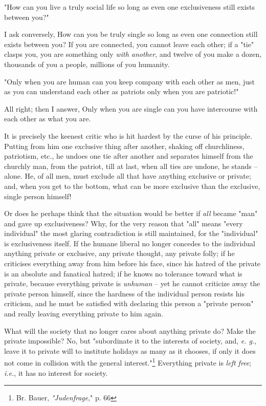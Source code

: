 \documentclass[a4paper]{book}
\begin{document}
"{}How can you live a truly social life so long as even one exclusiveness 
still exists between you?"{}

I ask conversely, How can you be truly single so long as even one connection 
still exists between you? If you are connected, you cannot leave each other; 
if a "{}tie"{} clasps you, you are something only \textit{with another}, and 
twelve of you make a dozen, thousands of you a people, millions of you 
humanity.

"{}Only when you are human can you keep company with each other as men, just 
as you can understand each other as patriots only when you are patriotic!"{}

All right; then I answer, Only when you are single can you have intercourse 
with each other as what you are.

It is precisely the keenest critic who is hit hardest by the curse of his 
principle. Putting from him one exclusive thing after another, shaking off 
churchliness, patriotism, etc., he undoes one tie after another and separates 
himself from the churchly man, from the patriot, till at last, when all ties 
are undone, he stands -- alone. He, of all men, must exclude all that have 
anything exclusive or private; and, when you get to the bottom, what can be 
more exclusive than the exclusive, single person himself!

Or does he perhaps think that the situation would be better if \textit{all} 
became "{}man"{} and gave up exclusiveness? Why, for the very reason that 
"{}all"{} means "{}every individual"{} the most glaring contradiction is still 
maintained, for the "{}individual"{} is exclusiveness itself. If the humane 
liberal no longer concedes to the individual anything private or exclusive, 
any private thought, any private folly; if he criticises everything away from 
him before his face, since his hatred of the private is an absolute and 
fanatical hatred; if he knows no tolerance toward what is private, because 
everything private is \textit{unhuman} -- yet he cannot criticize away the 
private person himself, since the hardness of the individual person resists 
his criticism, and he must be satisfied with declaring this person a 
"{}private person"{} and really leaving everything private to him again.

What will the society that no longer cares about anything private do? Make the 
private impossible? No, but "{}subordinate it to the interests of society, 
and, \textit{e. g.}, leave it to private will to institute holidays as many as 
it chooses, if only it does not come in collision with the general 
interest."{}\footnote{Br. Bauer, \textit{"{}Judenfrage},"{} p. 66} Everything 
private is \textit{left free}; \textit{i.e.}, it has no interest for society.
\end{document}
